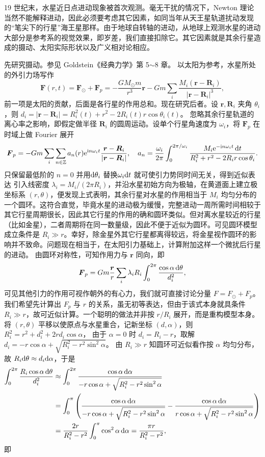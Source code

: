 19 世纪末，水星近日点进动现象被首次观测。毫无干扰的情况下，Newton 理论当然不能解释进动，因此必须要考虑其它因素，如同当年从天王星轨道扰动发现的“笔尖下的行星”海王星那样。由于地球自转轴的进动，从地球上观测水星的进动大部分是参考系的视觉效果，即岁差，我们直接扣除它。其它因素就是其余行星造成的摄动、太阳实际形状以及广义相对论相应。

先研究摄动。参见 Goldstein《经典力学》第 5$\sim$8 章。
以太阳为参考，水星所处的外引力场写作
\[\bm F(r,t)=\bm F_\odot+\bm F_p=-\frac{{G{M_\odot}m}}{r^3}\bm r-Gm\sum_i\frac{M_i(\bm r-\bm R_i)}{|\bm r-\bm R_i|^3},\]
前一项是太阳的贡献，后面是各行星的作用总和。现在研究后者。设 $\bm r,\bm R_i$ 夹角 $\theta_i$，则 $d_i=|\bm r-\bm R_i|=R_i^2(t)+r^2-2R_i(t)r\cos\theta_i(t)$。
忽略其余行星轨道的离心率之影响，即假定做半径 $\bm R_i$ 的圆周运动。设单个行星角速度为 $\omega_i$，将 $\bm F_p$ 在时域上做 Fourier 展开
\[
\vb* F_p=- Gm\sum_i \sum_{n\in\mathbb{Z}} {{a_n}(r){\mathrm{e}^{\mathrm{i} n{\omega_i}t}}}\frac{\vb* r-\vb* R_i}{|\vb* r-\vb* R_i|},\quad a_n=\frac{\omega_i}{2\pi}\int_0^{2\pi/\omega_i}{\frac{{M_i\mathrm{e}^{-\mathrm{i} n\omega_i t}\,\dd t}}{{R_i^2 + r^2 - 2R_ir\cos \theta_i}}}.
\]
只保留最低阶的 $n=0$ 并用$\dd\theta_i$ 替换$\omega_i\dd t$ 就可使引力势同时间无关，得到近似表达
引入线密度 $\lambda_i=M_i/(2\pi R_i)$，并沿水星初始方向为极轴，在黄道面上建立极坐标系 $(r,\theta)$，便发现上式表明，其余行星对水星的作用相当于 $M_i$ 均匀分布的一个圆环。这符合直觉，毕竟水星的进动极为缓慢，完整进动一周所需时间相较于其它行星周期很长，因此其它行星的作用的确和圆环类似。但对离水星较近的行星（比如金星），二者周期将在同一数量级，因此不便于近似为圆环。可见圆环模型成立条件是 $R_i\gg r$。幸好，除金星外其它行星都离得较远，将金星视作圆环的影响并不致命。问题现在相当于，在太阳引力基础上，计算附加这样一个微扰后行星的进动。
由圆环对称性，可知作用力与 $\bm r$ 同向，即
\[
\vb* F_p= Gm\frac{\vb* r}{r}\sum_i  \lambda_iR_i\int_0^{2\pi } \frac{\cos\alpha\,\dd\theta}{ d_i^2},
\]
可见其他引力的作用可视作朝外的有心力，我们就可直接讨论分量 $F=F_\odot+F_p$。
我们希望先计算出 $F_p$ 与 $r$ 的关系，虽无初等表达，但由于该式本身就具条件 $R_i\gg r$，故可近似计算。一个聪明的做法并非按 $r/R_i$ 展开，而是重构模型本身。将 $(r,\theta)$ 平移以使原点与水星重合，记新坐标 $(d,\alpha)$，则 $R_i^2=r^2+d_i^2+2rd_i\cos\alpha$，
由于 $\alpha=0$ 时 $d_i=R_i-r$，取解 $d_i=-r\cos\alpha+\sqrt{R_i^2-r^2\sin^2\alpha}$。
由 $R_i\gg r$ 知圆环可近似看作按 $\alpha$ 均匀分布，故 $ R_i\dd\theta\approx d_i\dd\alpha$，于是
\begin{align*}
    \int_0^{2\pi } \frac{R_i\cos\alpha\,\dd\theta}{ d_i^2 }&\approx \int_0^{2\pi } \frac{\cos\alpha\dd{\alpha}}{-r\cos\alpha+\sqrt{R_i^2-r^2\sin^2\alpha}}\\
    &=\int_0^{\pi } \left(\frac{\cos\alpha\dd{\alpha}}{-r\cos\alpha+\sqrt{R_i^2-r^2\sin^2\alpha}}-\frac{\cos\alpha\dd{\alpha}}{r\cos\alpha+\sqrt{R_i^2-r^2\sin^2\alpha}}\right)\\
    &=\frac{2r}{R_i^2-r^2} \int_0^{\pi }\cos^2\alpha\dd{\alpha}=\frac{\pi r}{R_i^2-r^2},
\end{align*}
即

